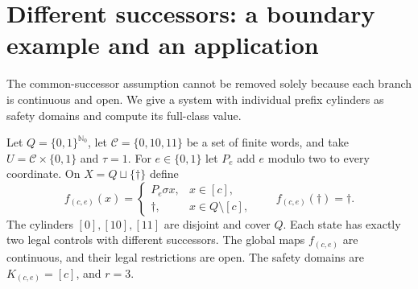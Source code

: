 \documentclass[11pt,reqno]{amsart}
\numberwithin{equation}{section}
\theoremstyle{definition}
\newcommand{\Nzero}{\mathbb N_0}
\begin{document}
\section{Different successors: a boundary example and an application}\label{sec:different}

The common-successor assumption cannot be removed solely because each
branch is continuous and open. We give a system with individual
prefix cylinders as safety domains and compute its full-class value.

Let $Q=\{0,1\}^{\Nzero}$, let $\mathcal C=\{0,10,11\}$ be a set of
finite words, and take $U=\mathcal C\times\{0,1\}$ and $\tau=1$.
For $e\in\{0,1\}$ let $P_e$ add $e$ modulo two to every coordinate.
On $X=Q\sqcup\{\dagger\}$ define
\begin{equation}\label{cc-eq:boundarysystem}
 f_{(c,e)}(x)=
 \begin{cases}P_e\sigma x,&x\in[c],\\
 \dagger,&x\in Q\setminus[c],\end{cases}
 \qquad f_{(c,e)}(\dagger)=\dagger.
\end{equation}
The cylinders $[0],[10],[11]$ are disjoint and cover $Q$. Each state
has exactly two legal controls with different successors. The global
maps $f_{(c,e)}$ are continuous, and their legal restrictions are open.
The safety domains are $K_{(c,e)}=[c]$, and $r=3$.
\end{document}
